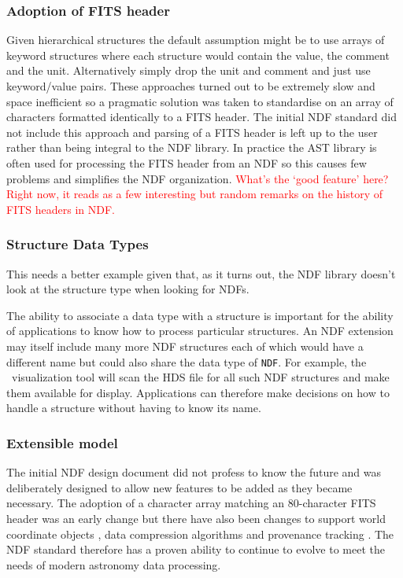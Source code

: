 \documentclass[final,authoryear,5p,times,twocolumn]{elsarticle}
\begin{document}
\subsubsection{Adoption of FITS header}

Given hierarchical structures the default assumption might be to use
arrays of keyword structures where each structure would contain the
value, the comment and the unit. Alternatively simply drop the unit
and comment and just use keyword/value pairs. These approaches turned
out to be extremely slow and space inefficient so a pragmatic solution
was taken to standardise on an array of characters formatted
identically to a FITS header. The initial NDF standard did not include
this approach and parsing of a FITS header is left up to the user
rather than being integral to the NDF library. In practice the AST
library \citep{1998ASPC..145...41W} is often used for processing the FITS
header from an NDF so this causes few problems and simplifies the NDF
organization.
\textcolor{red}{What's the `good feature' here?  Right now, it reads
  as a few interesting but random remarks on the history of FITS
  headers in NDF.}

\subsubsection{Structure Data Types}

{\color{red} This needs a better example given that, as it turns out,
  the NDF library doesn't look at the structure type when looking for NDFs.}

The ability to associate a data type with a structure is important for
the ability of applications to know how to process particular
structures. An NDF extension may itself include many more NDF
structures each of which would have a different name but could also
share the data type of \texttt{NDF}. For example, the \gaia\
visualization tool \citep{2009ASPC..411..575D} will scan the HDS file
for all such NDF structures and make them available for
display. Applications can therefore make decisions on how to handle a
structure without having to know its name.

\subsubsection{Extensible model}

The initial NDF design document did not profess to know the future and
was deliberately designed to allow new features to be added as they
became necessary. The adoption of a character array matching an
80-character FITS header was an early change but there have also been
changes to support world coordinate objects
\citep{2001ASPC..238..129B}, data compression algorithms
\citep{2008ASPC..394..650C} and provenance tracking
\citep{2009ASPC..411..418J}. The NDF standard therefore has a proven
ability to continue to evolve
to meet the needs of modern astronomy data processing.
\end{document}
